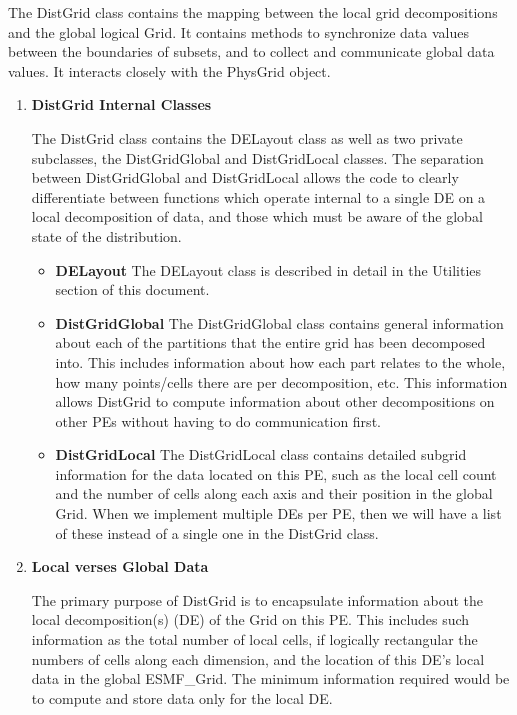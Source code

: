 

The DistGrid class contains the mapping between the local grid decompositions
and the global logical Grid.  It contains methods to synchronize data values
between the boundaries of subsets, and to collect and communicate global data
values.  It interacts closely with the PhysGrid object.

\begin{enumerate}

\item {\bf DistGrid Internal Classes}

The DistGrid class contains the DELayout class as well as two private subclasses,
the DistGridGlobal and DistGridLocal classes.  The separation between DistGridGlobal
and DistGridLocal allows the code to clearly differentiate between functions which
operate internal to a single DE on a local decomposition of data, and those which
must be aware of the global state of the distribution.
\begin{itemize}
\item {\bf DELayout} The DELayout class is described in detail in the Utilities
section of this document.
\item {\bf DistGridGlobal} The DistGridGlobal class contains general information
about each of the partitions that the entire grid has been decomposed into. This
includes information about how each part relates to the whole, how many points/cells
there are per decomposition, etc.  This information allows DistGrid to compute
information about other decompositions on other PEs without having to do communication
first.
\item {\bf DistGridLocal} The DistGridLocal class contains detailed subgrid
information for the data located on this PE, such as the local cell count and the
number of cells along each axis and their position in the global Grid.  When we
implement multiple DEs per PE, then we will have a list of these instead of a single
one in the DistGrid class.
\end{itemize}

\item {\bf Local verses Global Data}

The primary purpose of DistGrid is to encapsulate information
about the local decomposition(s) (DE) of the Grid on this PE.  
This includes such information as the total 
number of local cells, if logically rectangular the numbers of cells along 
each dimension, and the location of this DE's local data in the
global ESMF\_Grid.  The minimum information required would be
to compute and store data only for the local DE.


\end{enumerate}
